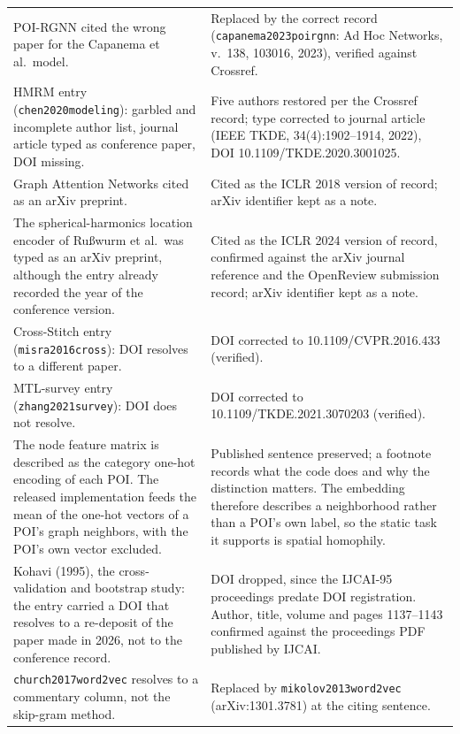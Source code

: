{\begin{longtable}{@{}p{}p{}@{}}
POI-RGNN cited the wrong paper for the Capanema et al.\ model. &
Replaced by the correct record (\texttt{capanema2023poirgnn}: Ad Hoc Networks,
v.~138, 103016, 2023), verified against Crossref. \\
\addlinespace
HMRM entry (\texttt{chen2020modeling}): garbled and incomplete author list, journal
article typed as conference paper, DOI missing. &
Five authors restored per the Crossref record; type corrected to journal article
(IEEE TKDE, 34(4):1902--1914, 2022), DOI 10.1109/TKDE.2020.3001025. \\
\addlinespace
Graph Attention Networks cited as an arXiv preprint. &
Cited as the ICLR 2018 version of record; arXiv identifier kept as a note. \\
\addlinespace
The spherical-harmonics location encoder of Ru\ss{}wurm et al.\ was typed as an arXiv
preprint, although the entry already recorded the year of the conference version. &
Cited as the ICLR 2024 version of record, confirmed against the arXiv journal reference
and the OpenReview submission record; arXiv identifier kept as a note. \\
\addlinespace
Cross-Stitch entry (\texttt{misra2016cross}): DOI resolves to a different paper. &
DOI corrected to 10.1109/CVPR.2016.433 (verified). \\
\addlinespace
MTL-survey entry (\texttt{zhang2021survey}): DOI does not resolve. &
DOI corrected to 10.1109/TKDE.2021.3070203 (verified). \\
\addlinespace
The node feature matrix is described as the category one-hot encoding of each POI. The
released implementation feeds the mean of the one-hot vectors of a POI's graph
neighbors, with the POI's own vector excluded. &
Published sentence preserved; a footnote records what the code does and why the
distinction matters. The embedding therefore describes a neighborhood rather than a
POI's own label, so the static task it supports is spatial homophily. \\
Kohavi (1995), the cross-validation and bootstrap study: the entry carried a DOI that
resolves to a re-deposit of the paper made in 2026, not to the conference record. &
DOI dropped, since the IJCAI-95 proceedings predate DOI registration. Author, title,
volume and pages 1137--1143 confirmed against the proceedings PDF published by IJCAI. \\
\addlinespace
\texttt{church2017word2vec} resolves to a commentary column, not the skip-gram
method. &
Replaced by \texttt{mikolov2013word2vec} (arXiv:1301.3781) at the citing sentence. \\

\end{longtable}}
